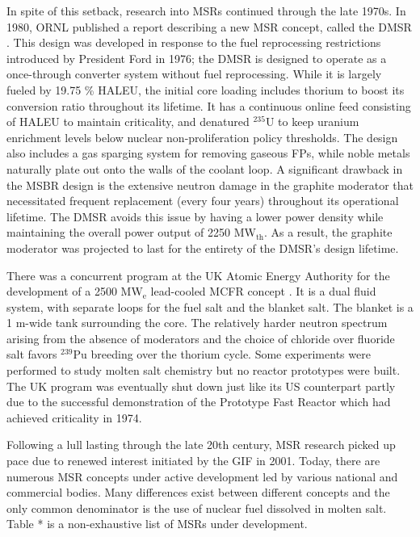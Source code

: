 In spite of this setback, research into \glspl{MSR} continued through the late
1970s. In 1980, \gls{ORNL} published a report describing a new \gls{MSR}
concept, called the \gls{DMSR} \cite{gehin_liquid_2016}. This design was
developed in response to the fuel reprocessing restrictions introduced by
President Ford in 1976; the \gls{DMSR} is designed to operate as a
once-through converter system without fuel reprocessing. While it is largely
fueled by 19.75 \% \gls{HALEU}, the initial core loading includes thorium to
boost its conversion ratio throughout its lifetime. It has a continuous
online feed consisting of \gls{HALEU} to maintain criticality, and denatured
$^{235}$U to keep uranium enrichment levels below nuclear non-proliferation
policy thresholds. The design also includes a gas sparging system for removing
gaseous \glspl{FP}, while noble metals naturally plate out onto the walls of
the coolant loop. A significant drawback in the \gls{MSBR} design is the
extensive neutron damage in the graphite moderator that necessitated frequent
replacement (every four years) throughout its operational lifetime. The
\gls{DMSR} avoids this issue by having a lower power density while maintaining
the overall power output of 2250 MW$_{\text{th}}$. As a result, the graphite
moderator was projected to last for the entirety of the \gls{DMSR}'s design
lifetime.

There was a concurrent program at the UK Atomic Energy Authority for the
development of a 2500 MW$_{\text{e}}$ lead-cooled
\gls{MCFR} concept \cite{smith_assessment_1974}. It is a dual fluid system,
with separate loops for the fuel salt and the blanket salt. The blanket is a
1 m-wide tank surrounding the core. The relatively harder neutron spectrum
arising from the absence of moderators and the choice of chloride over
fluoride salt favors $^{239}$Pu breeding over the thorium cycle. Some
experiments were performed to study molten salt chemistry but no reactor
prototypes were built. The UK program was eventually shut down just like its
US counterpart partly due to the successful demonstration of the Prototype
Fast Reactor which had achieved criticality in 1974.

Following a lull lasting through the late 20th century, \gls{MSR} research
picked up pace due to renewed interest initiated by the \gls{GIF} in 2001.
Today, there are numerous \gls{MSR} concepts under active development led by
various national and commercial bodies. Many differences exist between
different concepts and the only common denominator is the use of nuclear fuel
dissolved in molten salt. Table * is a non-exhaustive list of \glspl{MSR}
under development.

